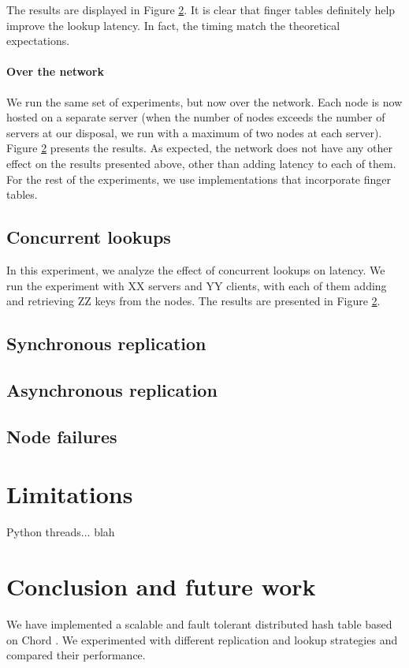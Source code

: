 \documentclass{sig-alternate-10pt}
\begin{document}
The results are displayed in Figure \ref{}. It is clear that finger tables definitely help improve the lookup latency. In fact, the timing match the theoretical expectations.

\paragraph{Over the network}
We run the same set of experiments, but now over the network. Each node is now hosted on a separate server (when the number of nodes exceeds the number of servers at our disposal, we run with a maximum of two nodes at each server). Figure \ref{} presents the results. As expected, the network does not have any other effect on the results presented above, other than adding latency to each of them.
For the rest of the experiments, we use implementations that incorporate finger tables.

\subsection{Concurrent lookups}
In this experiment, we analyze the effect of concurrent lookups on latency. We run the experiment with XX servers and YY clients, with each of them adding and retrieving ZZ keys from the nodes. The results are presented in Figure \ref{}.


\subsection{Synchronous replication}

\subsection{Asynchronous replication}

\subsection{Node failures}

\section{Limitations}
Python threads...  blah

\section{Conclusion and future work}
We have implemented a scalable and fault tolerant distributed hash table based on Chord \cite{chord}. We experimented with different replication and lookup strategies and compared their performance. 
\end{document}
